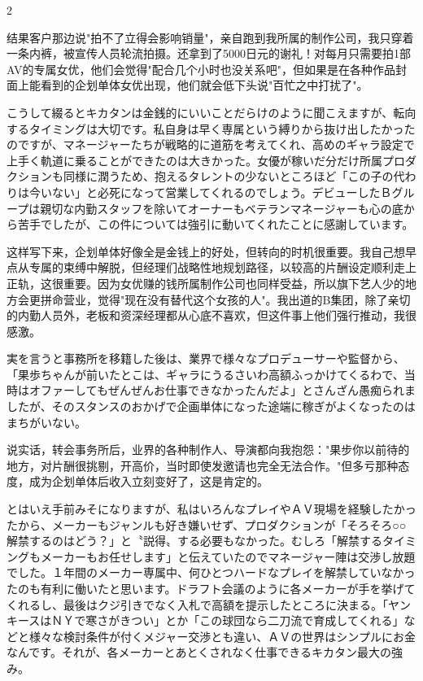 \documentclass[12pt,UTF8]{ctexbook}
\begin{document}
\begin{paracol}{2}
\switchcolumn

结果客户那边说"拍不了立得会影响销量"，亲自跑到我所属的制作公司，我只穿着一条内裤，被宣传人员轮流拍摄。还拿到了5000日元的谢礼！对每月只需要拍1部AV的专属女优，他们会觉得"配合几个小时也没关系吧"，但如果是在各种作品封面上能看到的企划单体女优出现，他们就会低下头说"百忙之中打扰了"。

\switchcolumn*

こうして綴るとキカタンは金銭的にいいことだらけのように聞こえますが、転向するタイミングは大切です。私自身は早く専属という縛りから抜け出したかったのですが、マネージャーたちが戦略的に道筋を考えてくれ、高めのギャラ設定で上手く軌道に乗ることができたのは大きかった。女優が稼いだ分だけ所属プロダクションも同様に潤うため、抱えるタレントの少ないところほど「この子の代わりは今いない」と必死になって営業してくれるのでしょう。デビューしたＢグループは親切な内勤スタッフを除いてオーナーもベテランマネージャーも心の底から苦手でしたが、この件については強引に動いてくれたことに感謝しています。

\switchcolumn

这样写下来，企划单体好像全是金钱上的好处，但转向的时机很重要。我自己想早点从专属的束缚中解脱，但经理们战略性地规划路径，以较高的片酬设定顺利走上正轨，这很重要。因为女优赚的钱所属制作公司也同样受益，所以旗下艺人少的地方会更拼命营业，觉得"现在没有替代这个女孩的人"。我出道的B集团，除了亲切的内勤人员外，老板和资深经理都从心底不喜欢，但这件事上他们强行推动，我很感激。

\switchcolumn*

実を言うと事務所を移籍した後は、業界で様々なプロデューサーや監督から、「果歩ちゃんが前いたとこは、ギャラにうるさいわ高額ふっかけてくるわで、当時はオファーしてもぜんぜんお仕事できなかったんだよ」とさんざん愚痴られましたが、そのスタンスのおかげで企画単体になった途端に稼ぎがよくなったのはまちがいない。

\switchcolumn

说实话，转会事务所后，业界的各种制作人、导演都向我抱怨："果步你以前待的地方，对片酬很挑剔，开高价，当时即使发邀请也完全无法合作。"但多亏那种态度，成为企划单体后收入立刻变好了，这是肯定的。

\switchcolumn*

とはいえ手前みそになりますが、私はいろんなプレイやＡＶ現場を経験したかったから、メーカーもジャンルも好き嫌いせず、プロダクションが「そろそろ○○解禁するのはどう？」と〝説得〟する必要もなかった。むしろ「解禁するタイミングもメーカーもお任せします」と伝えていたのでマネージャー陣は交渉し放題でした。１年間のメーカー専属中、何ひとつハードなプレイを解禁していなかったのも有利に働いたと思います。ドラフト会議のように各メーカーが手を挙げてくれるし、最後はクジ引きでなく入札で高額を提示したところに決まる。「ヤンキースはＮＹで寒さがきつい」とか「この球団なら二刀流で育成してくれる」などと様々な検討条件が付くメジャー交渉とも違い、ＡＶの世界はシンプルにお金なんです。それが、各メーカーとあとくされなく仕事できるキカタン最大の強み。


\end{paracol}
\end{document}
